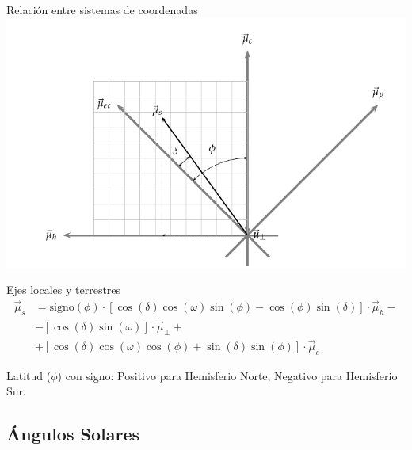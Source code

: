 \documentclass[xcolor={usenames,svgnames,dvipsnames}]{beamer}
\begin{document}
\begin{frame}[label=sec-1-2-5]{Relación entre sistemas de coordenadas}
\includegraphics[width=.9\linewidth]{../figs/RelacionSistemasCoordenadas.pdf}
\end{frame}

\begin{frame}[label=sec-1-2-6]{Ejes locales y terrestres}
\begin{align*}
  \vec{\mu}_{s} &= \mathrm{signo}(\phi)\cdot\left[\cos\left(\delta\right)\cos\left(\omega\right)\sin\left(\phi\right)-\cos\left(\phi\right)\sin\left(\delta\right)\right]\cdot\vec{\mu}_{h}-\\
  &- \left[\cos\left(\delta\right)\sin\left(\omega\right)\right]\cdot\vec{\mu}_{\bot}+\\
  &+ \left[\cos\left(\delta\right)\cos\left(\omega\right)\cos\left(\phi\right)+\sin\left(\delta\right)\sin\left(\phi\right)\right]\cdot\vec{\mu}_{c} 
\end{align*}

\alert{Latitud ($\phi$) con signo}: Positivo para Hemisferio Norte, Negativo para Hemisferio Sur.
\end{frame}

\subsection{Ángulos Solares}
\label{sec-1-3}
\end{document}
